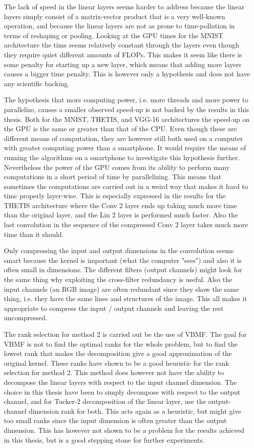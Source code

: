 The lack of speed in the linear layers seems harder to address because the linear layers simply consist of a matrix-vector product that is a very well-known operation, and because the linear layers are not as prone to time-pollution in terms of reshaping or pooling. Looking at the GPU times for the MNIST architecture the time seems relatively constant through the layers even though they require quiet different amounts of FLOPs. This makes it seem like there is some penalty for starting up a new layer, which means that adding more layers causes a bigger time penalty. This is however only a hypothesis and does not have any scientific backing.

The hypothesis that more computing power, i.e. more threads and more power to parallelize, causes a smaller observed speed-up is not backed by the results in this thesis. Both for the MNIST, THETIS, and VGG-16 architectures the speed-up on the GPU is the same or greater than that of the CPU. Even though these are different means of computation, they are however still both used on a computer with greater computing power than a smartphone. It would require the means of running the algorithms on a smartphone to investigate this hypothesis further. Nevertheless the power of the GPU comes from its ability to perform many computations in a short period of time by parallelizing. This means that sometimes the computations are carried out in a weird way that makes it hard to time properly layer-wise. This is especially expressed in the results for the THETIS architecture where the Conv 2 layer ends up taking much more time than the original layer, and the Lin 2 layer is performed much faster. Also the last convolution in the sequence of the compressed Conv 2 layer takes much more time than it should.

Only compressing the input and output dimensions in the convolution seems smart because the kernel is important (what the computer "sees") and also it is often small in dimensions. The different filters (output channels) might look for the same thing why exploiting the cross-filter redundancy is useful. Also the input channels (an RGB image) are often redundant since they show the same thing, i.e. they have the same lines and structures of the image. This all makes it appropriate to compress the input / output channels and leaving the rest uncompressed.

The rank selection for method 2 is carried out be the use of VBMF. The goal for VBMF is not to find the optimal ranks for the whole problem, but to find the lowest rank that makes the decomposition give a good approximation of the original kernel. These ranks have shown to be a good heuristic for the rank selection for method 2. This method does however not have the ability to decompose the linear layers with respect to the input channel dimension. The choice in this thesis have been to simply decompose with respect to the output channel, and for Tucker-2 decomposition of the linear layer, use the output-channel dimension rank for both. This acts again as a heuristic, but might give too small ranks since the input dimension is often greater than the output dimension. This has however not shown to be a problem for the results achieved in this thesis, but is a good stepping stone for further experiments.

